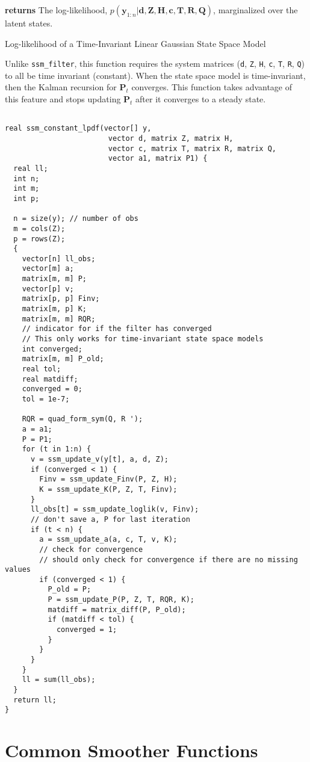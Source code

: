 \documentclass[]{book}
\newcommand{\mat}[1]{\boldsymbol{#1}}
\renewcommand{\vec}[1]{\boldsymbol{#1}}
\begin{document}
\textbf{returns} The log-likelihood,
\(p(\vec{y}_{1:n} | \vec{d}, \mat{Z}, \mat{H}, \vec{c}, \mat{T}, \mat{R}, \mat{Q})\),
marginalized over the latent states.

Log-likelihood of a Time-Invariant Linear Gaussian State Space Model

Unlike \texttt{ssm\_filter}, this function requires the system matrices
(\texttt{d}, \texttt{Z}, \texttt{H}, \texttt{c}, \texttt{T}, \texttt{R},
\texttt{Q}) to all be time invariant (constant). When the state space
model is time-invariant, then the Kalman recursion for \(\mat{P}_t\)
converges. This function takes advantage of this feature and stops
updating \(\mat{P}_t\) after it converges to a steady state.

\begin{verbatim}

real ssm_constant_lpdf(vector[] y,
                        vector d, matrix Z, matrix H,
                        vector c, matrix T, matrix R, matrix Q,
                        vector a1, matrix P1) {
  real ll;
  int n;
  int m;
  int p;

  n = size(y); // number of obs
  m = cols(Z);
  p = rows(Z);
  {
    vector[n] ll_obs;
    vector[m] a;
    matrix[m, m] P;
    vector[p] v;
    matrix[p, p] Finv;
    matrix[m, p] K;
    matrix[m, m] RQR;
    // indicator for if the filter has converged
    // This only works for time-invariant state space models
    int converged;
    matrix[m, m] P_old;
    real tol;
    real matdiff;
    converged = 0;
    tol = 1e-7;

    RQR = quad_form_sym(Q, R ');
    a = a1;
    P = P1;
    for (t in 1:n) {
      v = ssm_update_v(y[t], a, d, Z);
      if (converged < 1) {
        Finv = ssm_update_Finv(P, Z, H);
        K = ssm_update_K(P, Z, T, Finv);
      }
      ll_obs[t] = ssm_update_loglik(v, Finv);
      // don't save a, P for last iteration
      if (t < n) {
        a = ssm_update_a(a, c, T, v, K);
        // check for convergence
        // should only check for convergence if there are no missing values
        if (converged < 1) {
          P_old = P;
          P = ssm_update_P(P, Z, T, RQR, K);
          matdiff = matrix_diff(P, P_old);
          if (matdiff < tol) {
            converged = 1;
          }
        }
      }
    }
    ll = sum(ll_obs);
  }
  return ll;
}

\end{verbatim}

\section{Common Smoother Functions}\label{common-smoother-functions}
\end{document}
